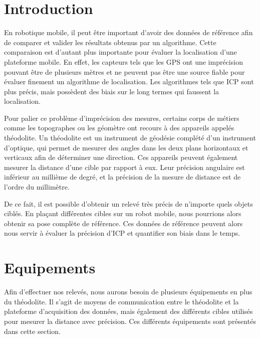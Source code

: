 \documentclass[10pt,letterpaper,oneside]{article}
\begin{document}
\makeCustomTitle
\thispagestyle{titlePage}

\section{Introduction}

En robotique mobile, il peut être important d'avoir des données de référence afin de comparer et valider les résultats obtenus par un algorithme.
Cette comparaison est d'autant plus importante pour évaluer la localisation d'une plateforme mobile.
En effet, les capteurs tels que les GPS ont une imprécision pouvant être de plusieurs mètres et ne peuvent pas être une source fiable pour évaluer finement un algorithme de localisation.
Les algorithmes tels que ICP sont plus précis, mais possèdent des biais sur le long termes qui faussent la localisation.

Pour palier ce problème d'imprécision des mesures, certains corps de métiers comme les topographes ou les géomètre ont recours à des appareils appelés théodolite.
Un théodolite est un instrument de géodésie complété d’un instrument d'optique, qui permet de mesurer des angles dans les deux plans horizontaux et verticaux afin de déterminer une direction.
Ces appareils peuvent également mesurer la distance d'une cible par rapport à eux.
Leur précision angulaire est inférieur au millième de degré, et la précision de la mesure de distance est de l'ordre du millimètre.

De ce fait, il est possible d'obtenir un relevé très précis de n'importe quels objets ciblés.
En plaçant différentes cibles sur un robot mobile, nous pourrions alors obtenir sa pose complète de référence.
Ces données de référence peuvent alors nous servir à évaluer la précision d'ICP et quantifier son biais dans le temps. 

\section{Equipements}

Afin d'effectuer nos relevés, nous aurons besoin de plusieurs équipements en plus du théodolite.
Il s'agit de moyens de communication entre le théodolite et la plateforme d'acquisition des données, mais également des différents cibles utilisés pour mesurer la distance avec précision.
Ces différents équipements sont présentés dans cette section.
\end{document}
